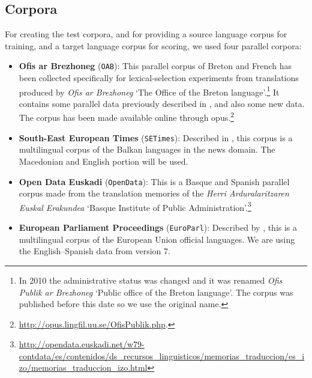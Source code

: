 \documentclass[11pt]{article}
\begin{document}
\subsection{Corpora}
\label{sec:eval-corpus}

For creating the test corpora, and for providing a source language corpus 
for training, and a target language corpus for scoring, we used four parallel corpora: 
\begin{itemize}
\item \textbf{Ofis ar Brezhoneg} (\texttt{OAB}): This parallel corpus
  of Breton and French has been collected specifically for
  lexical-selection experiments from translations produced by
  \emph{Ofis ar Brezhoneg} `The Office of the Breton
  language'.\footnote{In 2010 the administrative status was changed
    and it was renamed \emph{Ofis Publik ar Brezhoneg} `Public office
    of the Breton language'. The corpus was published before this date
    so we use the original name.}  It contains some parallel data
  previously described in \cite{tyers09b}, and also some new data. The
  corpus has been made available online through {\sc opus}.\footnote{\url{http://opus.lingfil.uu.se/OfisPublik.php}.}
\item \textbf{South-East European Times} (\texttt{SETimes}): Described
  in \cite{tyers10}, this corpus is a multilingual corpus of the
  Balkan languages in the news domain. The Macedonian and English
  portion will be used.
\item \textbf{Open Data Euskadi} (\texttt{OpenData}): This is a Basque
  and Spanish parallel corpus made from the translation memories of
  the \emph{Herri Arduralaritzaren Euskal Erakundea} `Basque Institute
  of Public
  Administration'.\footnote{\url{http://opendata.euskadi.net/w79-contdata/es/contenidos/ds_recursos_linguisticos/memorias_traduccion/es_izo/memorias_traduccion_izo.html}}
\item \textbf{European Parliament Proceedings} (\texttt{EuroParl}):
  Described by \cite{koehn05a}, this is a multilingual corpus of the
  European Union official languages. We are using the English--Spanish
  data from version 7.
\end{itemize}
\end{document}
